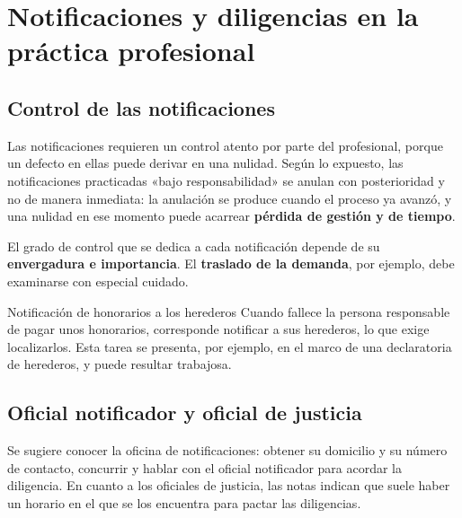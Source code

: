 \documentclass[12pt,oneside]{book}
\begin{document}
\chapter[Notificaciones y diligencias]{Notificaciones y diligencias en la práctica profesional}

\section{Control de las notificaciones}

Las notificaciones requieren un control atento por parte del profesional, porque un defecto en ellas puede derivar en una nulidad. Según lo expuesto, las notificaciones practicadas «bajo responsabilidad» se anulan con posterioridad y no de manera inmediata: la anulación se produce cuando el proceso ya avanzó, y una nulidad en ese momento puede acarrear \textbf{pérdida de gestión y de tiempo}.

El grado de control que se dedica a cada notificación depende de su \textbf{envergadura e importancia}. El \textbf{traslado de la demanda}, por ejemplo, debe examinarse con especial cuidado.

\begin{example}{Notificación de honorarios a los herederos}
Cuando fallece la persona responsable de pagar unos honorarios, corresponde notificar a sus herederos, lo que exige localizarlos. Esta tarea se presenta, por ejemplo, en el marco de una declaratoria de herederos, y puede resultar trabajosa.
\end{example}

\section{Oficial notificador y oficial de justicia}

Se sugiere conocer la oficina de notificaciones: obtener su domicilio y su número de contacto, concurrir y hablar con el oficial notificador para acordar la diligencia. En cuanto a los oficiales de justicia, las notas indican que suele haber un horario en el que se los encuentra para pactar las diligencias.
\end{document}
